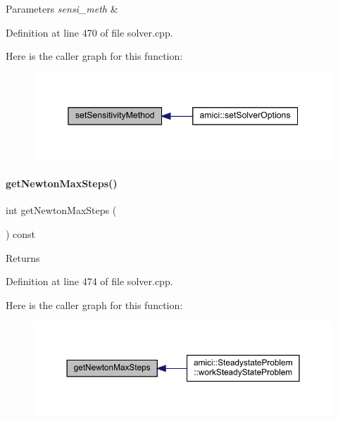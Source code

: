 \begin{DoxyParams}{Parameters}
{\em sensi\+\_\+meth} & \\
\hline
\end{DoxyParams}


Definition at line 470 of file solver.\+cpp.

Here is the caller graph for this function\+:
\nopagebreak
\begin{figure}[H]
\begin{center}
\leavevmode
\includegraphics[width=345pt]{classamici_1_1_solver_a3a7713f2ce77ffade77445a825ad289d_icgraph}
\end{center}
\end{figure}
\mbox{\label{classamici_1_1_solver_ad68589cfe3af35633ff5fa1a4e7aaddb}} 
\paragraph{\texorpdfstring{get\+Newton\+Max\+Steps()}{getNewtonMaxSteps()}}
{\footnotesize\ttfamily int get\+Newton\+Max\+Steps (\begin{DoxyParamCaption}{ }\end{DoxyParamCaption}) const}

\begin{DoxyReturn}{Returns}

\end{DoxyReturn}


Definition at line 474 of file solver.\+cpp.

Here is the caller graph for this function\+:
\nopagebreak
\begin{figure}[H]
\begin{center}
\leavevmode
\includegraphics[width=350pt]{classamici_1_1_solver_ad68589cfe3af35633ff5fa1a4e7aaddb_icgraph}
\end{center}
\end{figure}
\mbox{\label{classamici_1_1_solver_abf2e868e186c724c8ab939ba261ef314}} 
